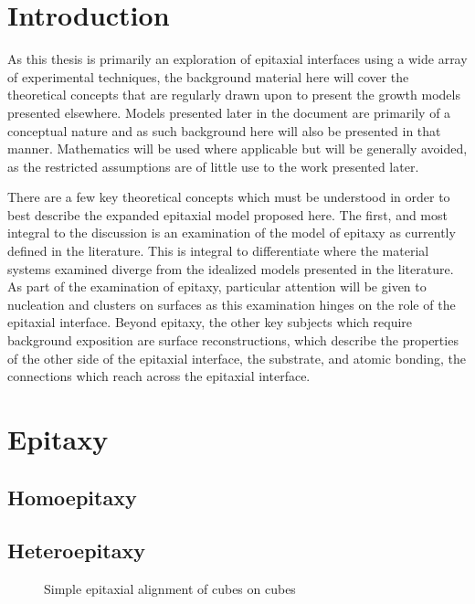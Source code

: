\section{Introduction}
As this thesis is primarily an exploration of epitaxial interfaces using a wide array of experimental techniques, the background material here will cover the theoretical concepts that are regularly drawn upon to present the growth models presented elsewhere. Models presented later in the document are primarily of a conceptual nature and as such background here will also be presented in that manner. Mathematics will be used where applicable but will be generally avoided, as the restricted assumptions are of little use to the work presented later.

There are a few key theoretical concepts which must be understood in order to best describe the expanded epitaxial model proposed here. The first, and most integral to the discussion is an examination of the model of epitaxy as currently defined in the literature. This is integral to differentiate where the material systems examined diverge from the idealized models presented in the literature. As part of the examination of epitaxy, particular attention will be given to nucleation and clusters on surfaces as this examination hinges on the role of the epitaxial interface. Beyond epitaxy, the other key subjects which require background exposition are surface reconstructions, which describe the properties of the other side of the epitaxial interface, the substrate, and atomic bonding, the connections which reach across the epitaxial interface.

\section{Epitaxy}
\subsection{Homoepitaxy}

\subsection{Heteroepitaxy}
%
%
\begin{figure}
    \centering
    \caption{\label{fig:back_hetero_alignment}Simple epitaxial alignment of cubes on cubes\cite{Palmstrom1995}}
\end{figure}
